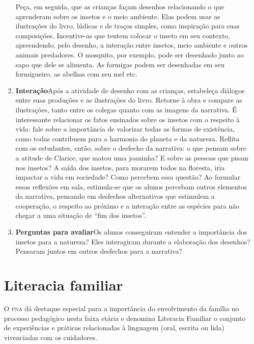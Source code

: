 \documentclass[11pt]{extarticle}
\begin{document}
\begin{enumerate}

Peça, em seguida, que as crianças façam desenhos relacionando o que aprenderam sobre os insetos e o meio ambiente. Elas podem usar as ilustrações do livro, lúdicas e de traços simples, como inspiração para suas composições. Incentive-as que tentem colocar o inseto em seu contexto, apreendendo, pelo desenho, a interação entre insetos, meio ambiente e outros animais predadores. O mosquito, por exemplo, pode ser desenhado junto ao sapo que dele se alimenta. As formigas podem ser desenhadas em seu formigueiro, as abelhas com seu mel etc.

\item \textbf{Interação}\quad Após a atividade de desenho com as crianças, estabeleça diálogos entre suas produções e as ilustrações do livro. Retorne à obra e compare as ilustrações, tanto entre os colegas quanto com as imagens da narrativa. É interessante relacionar os fatos ensinados sobre os insetos com o respeito à vida: fale sobre a importância de valorizar todas as formas de existência, como todas contribuem para a harmonia do planeta e da natureza. Reflita com os estudantes, então, sobre o desfecho da narrativa: o que pensam sobre a atitude de Clarice, que matou uma joaninha? E sobre as pessoas que pisam nos insetos? A saída dos insetos, para morarem todos na floresta, iria impactar a vida em sociedade? Como percebem essa questão? Ao formular essas reflexões em sala, estimula-se que os alunos percebam outros elementos da narrativa, pensando em desfechos alternativos que estimulem a cooperação, o respeito ao próximo e a interação entre as espécies para não chegar a uma situação de ``fim dos insetos''.

\item \textbf{Perguntas para avaliar}\quad Os alunos conseguiram
entender a importância dos insetos para a natureza? Eles interagiram durante a elaboração dos desenhos? Pensaram juntos em outros desfechos para a narrativa? 
\end{enumerate}


\section{Literacia familiar}
O \textsc{pna} dá destaque especial para a importância do envolvimento da família 
no processo pedagógico nesta faixa etária e denomina Literacia Familiar o conjunto 
de experiências e práticas relacionadas à linguagem (oral, escrita ou lida) vivenciadas 
com os cuidadores. 
\end{document}
